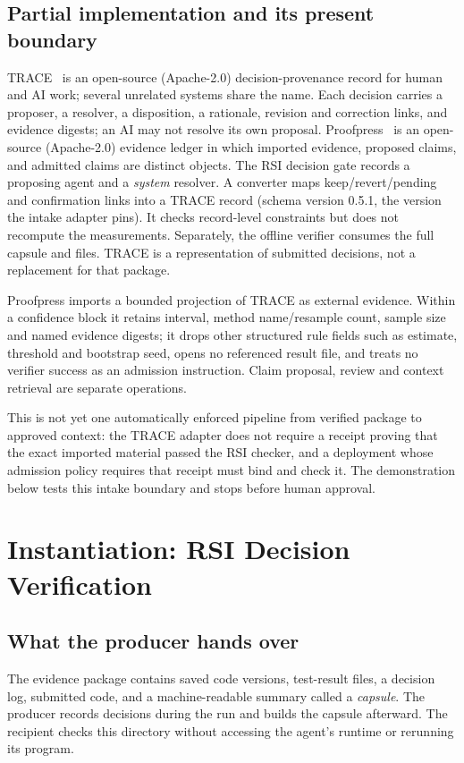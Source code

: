 \documentclass[conference]{IEEEtran}
\begin{document}
\subsection{Partial implementation and its present boundary}
TRACE~\cite{trace} is an open-source (Apache-2.0) decision-provenance record for human and AI work; several unrelated systems share the name. Each decision carries a proposer, a resolver, a disposition, a rationale, revision and correction links, and evidence digests; an AI may not resolve its own proposal. Proofpress~\cite{proofpress} is an open-source (Apache-2.0) evidence ledger in which imported evidence, proposed claims, and admitted claims are distinct objects. The RSI decision gate records a proposing agent and a \emph{system} resolver. A converter maps keep/revert/pending and confirmation links into a TRACE record (schema version 0.5.1, the version the intake adapter pins). It checks record-level constraints but does not recompute the measurements. Separately, the offline verifier consumes the full capsule and files. TRACE is a representation of submitted decisions, not a replacement for that package.

Proofpress imports a bounded projection of TRACE as external evidence. Within a confidence block it retains interval, method name/resample count, sample size and named evidence digests; it drops other structured rule fields such as estimate, threshold and bootstrap seed, opens no referenced result file, and treats no verifier success as an admission instruction. Claim proposal, review and context retrieval are separate operations.

This is not yet one automatically enforced pipeline from verified package to approved context: the TRACE adapter does not require a receipt proving that the exact imported material passed the RSI checker, and a deployment whose admission policy requires that receipt must bind and check it. The demonstration below tests this intake boundary and stops before human approval.

\section{Instantiation: RSI Decision Verification}
\subsection{What the producer hands over}
The evidence package contains saved code versions, test-result files, a decision log, submitted code, and a machine-readable summary called a \emph{capsule}. The producer records decisions during the run and builds the capsule afterward. The recipient checks this directory without accessing the agent's runtime or rerunning its program.
\end{document}
